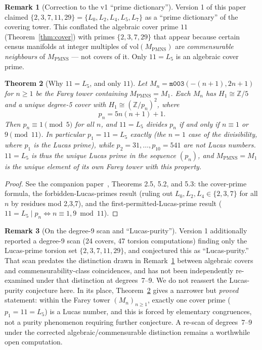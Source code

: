 \documentclass[12pt]{article}
\newtheorem{theorem}{Theorem}
\theoremstyle{definition}
\newtheorem{remark}[theorem]{Remark}
\newcommand{\Z}{\mathbb{Z}}
\begin{document}
\begin{remark}[Correction to the v1 ``prime dictionary'']
\label{rem:dict-correction}
Version 1 of this paper claimed
$\{2,3,7,11,29\}=\{L_0,L_2,L_4,L_5,L_7\}$ as a ``prime dictionary'' of
the covering tower. This conflated the algebraic cover prime $11$
(Theorem~\ref{thm:cover}) with primes $\{2,3,7,29\}$ that appear
because certain census manifolds at integer multiples of
$\mathrm{vol}(M_{\mathrm{PMNS}})$ are \emph{commensurable neighbours}
of $M_{\mathrm{PMNS}}$ --- not covers of it. Only $11=L_5$ is an
algebraic cover prime.
\end{remark}

\begin{theorem}[Why $11=L_5$, and only $11$]
\label{thm:why11}
Let $M_n=\texttt{m003}(-(n+1),2n+1)$ for $n\geq1$ be the Farey tower
containing $M_{\mathrm{PMNS}}=M_1$. Each $M_n$ has $H_1\cong\Z/5$ and
a unique degree-5 cover with $H_1\cong(\Z/p_n)^2$, where
\[
  p_n = 5n(n+1)+1.
\]
Then $p_n\equiv1\pmod5$ for all $n$, and $11=L_5$ divides $p_n$ if and
only if $n\equiv1$ or $9\pmod{11}$. In particular $p_1=11=L_5$
exactly (the $n=1$ case of the divisibility, where $p_1$ \emph{is}
the Lucas prime), while $p_2=31,\ldots,p_{10}=541$ are not Lucas
numbers. $11=L_5$ is thus the \emph{unique} Lucas prime in the
sequence $(p_n)$, and $M_{\mathrm{PMNS}}=M_1$ is the unique element
of its own Farey tower with this property.
\end{theorem}

\begin{proof}
See the companion paper~\cite{gentry-z5bridge}, Theorems 2.5, 5.2,
and 5.3: the cover-prime formula, the forbidden-Lucas-primes result
(ruling out $L_0,L_2,L_4\in\{2,3,7\}$ for all $n$ by residues mod
2,3,7), and the first-permitted-Lucas-prime result
($11=L_5\mid p_n\iff n\equiv1,9\bmod11$).
\end{proof}

\begin{remark}[On the degree-9 scan and ``Lucas-purity'']
\label{rem:purity-status}
Version 1 additionally reported a degree-9 scan (24 covers, 47
torsion computations) finding only the Lucas-prime torsion set
$\{2,3,7,11,29\}$, and conjectured this as ``Lucas-purity.'' That
scan predates the distinction drawn in
Remark~\ref{rem:dict-correction} between algebraic covers and
commensurability-class coincidences, and has not been independently
re-examined under that distinction at degrees~7--9. We do not
reassert the Lucas-purity conjecture here. In its place,
Theorem~\ref{thm:why11} gives a narrower but \emph{proved} statement:
within the Farey tower $(M_n)_{n\geq1}$, exactly one cover prime
($p_1=11=L_5$) is a Lucas number, and this is forced by elementary
congruences, not a purity phenomenon requiring further conjecture.
A re-scan of degrees~7--9 under the corrected algebraic/commensurable
distinction remains a worthwhile open computation.
\end{remark}
\end{document}
